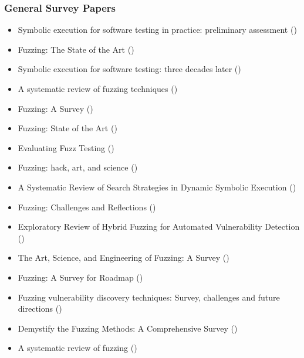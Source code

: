\documentclass{article}
\begin{document}
\subsubsection{General Survey Papers}
\begin{itemize}
    \item    Symbolic execution for software testing in practice: preliminary assessment (\citeyear{PreliminaryAssessment})\cite{PreliminaryAssessment}
    \item    Fuzzing: The State of the Art (\citeyear{FuzzingTheStateOfTheArt})\cite{FuzzingTheStateOfTheArt}
    \item    Symbolic execution for software testing: three decades later (\citeyear{ReviewThreeDecades})\cite{ReviewThreeDecades}
    \item    A systematic review of fuzzing techniques (\citeyear{Science})\cite{Science}
    \item    Fuzzing: A Survey (\citeyear{FuzzingASurvey})\cite{FuzzingASurvey}
    \item    Fuzzing: State of the Art (\citeyear{FuzzingStateOfTheArt2018})\cite{FuzzingStateOfTheArt2018}
    \item    Evaluating Fuzz Testing (\citeyear{EvaluatingFuzzTesting})\cite{EvaluatingFuzzTesting}
    \item    Fuzzing: hack, art, and science (\citeyear{HackArtScience})\cite{HackArtScience}
    \item    A Systematic Review of Search Strategies in Dynamic Symbolic Execution (\citeyear{SearchStrategies})\cite{SearchStrategies}
    \item    Fuzzing: Challenges and Reflections (\citeyear{ChallengesAndReflections})\cite{ChallengesAndReflections}
    \item    Exploratory Review of Hybrid Fuzzing for Automated Vulnerability Detection (\citeyear{Hybrid})\cite{Hybrid}
    \item    The Art, Science, and Engineering of Fuzzing: A Survey (\citeyear{ArtScienceEngineeringFuzzing})\cite{ArtScienceEngineeringFuzzing}
    \item    Fuzzing: A Survey for Roadmap (\citeyear{FuzzingASurveyforRoadmap})\cite{FuzzingASurveyforRoadmap}
    \item    Fuzzing vulnerability discovery techniques: Survey, challenges and future directions (\citeyear{FuzzingVulnerabilityDiscoveryTechniques})\cite{FuzzingVulnerabilityDiscoveryTechniques}
    \item    Demystify the Fuzzing Methods: A Comprehensive Survey (\citeyear{Demystifying})\cite{Demystifying}
    \item    A systematic review of fuzzing (\citeyear{SystematicReview2023})\cite{SystematicReview2023}
\end{itemize}
\end{document}

